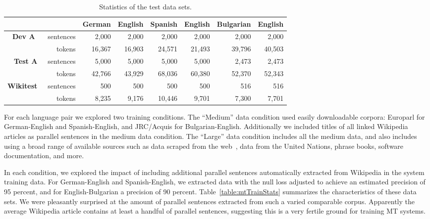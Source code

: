 \documentclass[11pt,letterpaper]{article}
\begin{document}
\begin{table}[ht]
\begin{center}
\begin{tabular}{|rr||r|r||r|r||r|r|}
\hline
      &                & German        & English       & Spanish       & English      & Bulgarian     & English   \\
\hline
\textbf{Dev A} \
      & sentences      & 2,000         & 2,000         & 2,000         & 2,000        & 2,000         & 2,000     \\
      & tokens    & 16,367        & 16,903        & 24,571        & 21,493       & 39,796        & 40,503    \\
\hline
\textbf{Test A}\
      & sentences      & 5,000         & 5,000         & 5,000         & 5,000        & 2,473         & 2,473     \\
      & tokens    & 42,766        & 43,929        & 68,036        & 60,380       & 52,370        & 52,343    \\
\hline
\textbf{Wikitest}\
      & sentences    & 500           & 500           & 500           & 500          & 516           & 516       \\
      & tokens    & 8,235         & 9,176         & 10,446        & 9,701        & 7,300         & 7,701     \\
\hline
\end{tabular}
\end{center}
\caption{Statistics of the test data sets.}
\label{table:mtTestStats}
\end{table}

For each language pair we explored two training conditions.  The
``Medium'' data
condition used easily downloadable corpora: Europarl for German-English and
Spanish-English, and JRC/Acquis for Bulgarian-English.  Additionally we
included titles of all linked Wikipedia articles as parallel sentences in
the medium data condition.  The ``Large'' data condition includes all the
medium
data, and also includes using a broad range of available sources such as
data scraped from the web~\cite{Resnik03}, data from the United
Nations, phrase books, software documentation, and more.

In each condition, we explored the impact of including additional
parallel sentences automatically extracted from Wikipedia in the
system training data. For German-English and Spanish-English, we
extracted data with the null loss adjusted to
achieve an estimated precision of 95 percent, and for
English-Bulgarian a precision of 90 percent. %
Table~\ref{table:mtTrainStats} summarizes the characteristics of
these data sets.  We were pleasantly surprised at the amount of
parallel sentences extracted from such a varied comparable corpus.
Apparently the average Wikipedia article contains at least a
handful of parallel sentences, suggesting this is a very fertile
ground for training MT systems.
\end{document}
